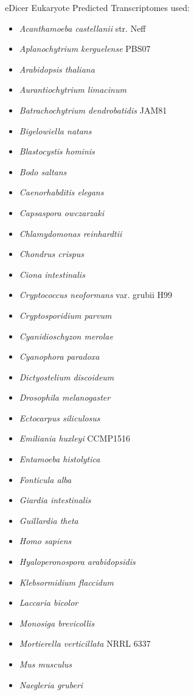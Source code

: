 eDicer Eukaryote Predicted Transcriptomes used:
\begin{itemize}
\item\textit{Acanthamoeba castellanii} str. Neff
\item\textit{Aplanochytrium kerguelense} PBS07
\item\textit{Arabidopsis thaliana}
\item\textit{Aurantiochytrium limacinum}
\item\textit{Batrachochytrium dendrobatidis} JAM81
\item\textit{Bigelowiella natans}
\item\textit{Blastocystis hominis}
\item\textit{Bodo saltans}
\item\textit{Caenorhabditis elegans}
\item\textit{Capsaspora owczarzaki}
\item\textit{Chlamydomonas reinhardtii}
\item\textit{Chondrus crispus}
\item\textit{Ciona intestinalis}
\item\textit{Cryptococcus neoformans} var. grubii H99
\item\textit{Cryptosporidium parvum}
\item\textit{Cyanidioschyzon merolae}
\item\textit{Cyanophora paradoxa}
\item\textit{Dictyostelium discoideum}
\item\textit{Drosophila melanogaster}
\item\textit{Ectocarpus siliculosus}
\item\textit{Emiliania huxleyi} CCMP1516
\item\textit{Entamoeba histolytica}
\item\textit{Fonticula alba}
\item\textit{Giardia intestinalis}
\item\textit{Guillardia theta}
\item\textit{Homo sapiens}
\item\textit{Hyaloperonospora arabidopsidis}
\item\textit{Klebsormidium flaccidum}
\item\textit{Laccaria bicolor}
\item\textit{Monosiga brevicollis}
\item\textit{Mortierella verticillata} NRRL 6337
\item\textit{Mus musculus}
\item\textit{Naegleria gruberi}

\end{itemize}

